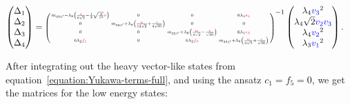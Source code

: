 \documentclass[a4paper,12pt]{article}
\def\RED{\textcolor{red}}
\def\BLUE{\textcolor{blue}}
\begin{document}
    \begin{align}
    \begin{pmatrix}
    \Delta_1\\ \Delta_2\\\Delta_3\\\Delta_4\\
    \end{pmatrix}&=
    \scalebox{0.7}{$
    \left(\begin{smallmatrix}
     m_{351'}-\lambda _8 \left(\frac{\RED{w}}{6 \sqrt{2}}-\frac{1}{2} \sqrt{\frac{3}{10}} \RED{v}\right)
   & 0 & 0 & 6 \lambda _1 \RED{e_1} \\
    0 & m_{351'}+\lambda_8 \left(\frac{\RED{w}}{12 \sqrt{2}}+\frac{\RED{v}}{4 \sqrt{30}}\right)& 0 & 0
   \\
    0 & 0 & m_{351'}+ \lambda _8\left(\frac{\RED{w}}{3 \sqrt{2}}-\frac{\RED{v}}{\sqrt{30}}\right) & 6 \lambda _1\RED{e_3} \\
    6 \lambda _2\RED{f_1} & 0 & 6 \lambda _2 \RED{f_3} & m_{351'}+ \lambda _8 \left(\frac{\RED{w}}{3 \sqrt{2}}+\frac{\RED{v}}{\sqrt{30}}\right)
    \end{smallmatrix}\right)$}^{-1}
    \begin{pmatrix}
    \lambda_4 \BLUE{v_3}^2\\ \lambda_4 \sqrt{2}\BLUE{v_2} \BLUE{v_3}\\ \lambda_4 \BLUE{v_2}^2\\ \lambda_3 \BLUE{v_1}^2\\
    \end{pmatrix}.
    \end{align}

After integrating out the heavy vector-like states from equation~\eqref{equation:Yukawa-terms-full}, and using the ansatz $c_1=f_5=0$, we get the matrices for the low energy states:
\end{document}
